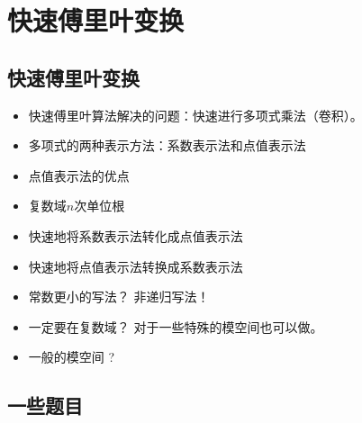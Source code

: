 \documentclass[9pt]{beamer}
\begin{document}
	\section{快速傅里叶变换}
		\subsection{快速傅里叶变换}
		\begin{frame}
			\begin{itemize}
				\item \pause 快速傅里叶算法解决的问题：快速进行多项式乘法（卷积）。
				\item \pause 多项式的两种表示方法：系数表示法和点值表示法
				\item \pause 点值表示法的优点
				\item \pause 复数域$n$次单位根
				\item \pause 快速地将系数表示法转化成点值表示法
				\item \pause 快速地将点值表示法转换成系数表示法
				\item \pause 常数更小的写法？ \pause 非递归写法！
				\item \pause 一定要在复数域？ \pause 对于一些特殊的模空间也可以做。 
				\item \pause 一般的模空间 ?
			\end{itemize}
		\end{frame}
		\subsection{一些题目}
		\begin{frame}
		\end{frame}
	
\end{document}
